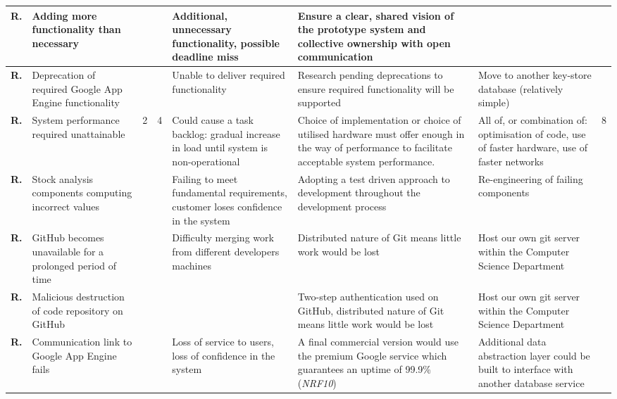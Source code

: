 \begin{longtable}[H]{| p{0.7cm} | p{2cm} | p{0.3cm} | p{0.3cm} | p{2.4cm} | p{4.1cm} | p{3cm} | p{0.4cm} |}
  \hline \textbf{R.}
  & Adding more functionality than necessary
  & 
  & 
  & Additional, unnecessary functionality, possible deadline miss
  & Ensure a clear, shared vision of the prototype system and collective ownership with open communication
  & 
  & \\
  
  \hline \textbf{R.}
  & Deprecation of required Google App Engine functionality
  & 
  & 
  & Unable to deliver required functionality
  & Research pending deprecations to ensure required functionality will be supported
  & Move to another key-store database (relatively simple)
  & \\
  
  \hline \textbf{R.}
  & System performance required unattainable
  & 2
  & 4
  & Could cause a task backlog: gradual increase in load until system
  is non-operational
  & Choice of implementation or choice of utilised hardware must offer
  enough in the way of performance to facilitate acceptable system
  performance.
  & All of, or combination of: optimisation of code, use of faster
  hardware, use of faster networks
  & 8 \\    
  
  \hline \textbf{R.}
  & Stock analysis components computing incorrect values
  & 
  & 
  & Failing to meet fundamental requirements, customer loses confidence in the system
  & Adopting a test driven approach to development throughout the development process
  & Re-engineering of failing components
  & \\
  
  \hline \textbf{R.}
  & GitHub becomes unavailable for a prolonged period of time
  & 
  & 
  & Difficulty merging work from different developers machines
  & Distributed nature of Git means little work would be lost
  & Host our own git server within the Computer Science Department
  & \\ 
  
  \hline \textbf{R.}
  & Malicious destruction of code repository on GitHub
  & 
  & 
  & 
  & Two-step authentication used on GitHub, distributed nature of Git means little work would be lost
  & Host our own git server within the Computer Science Department
  & \\  
  
  \hline \textbf{R.}
  & Communication link to Google App Engine fails
  & 
  & 
  & Loss of service to users, loss of confidence in the system
  & A final commercial version would use the premium Google service which guarantees an uptime of 99.9\% (\textit{NRF10})
  & Additional data abstraction layer could be built to interface with another database service
  & \\
  

\end{longtable}
